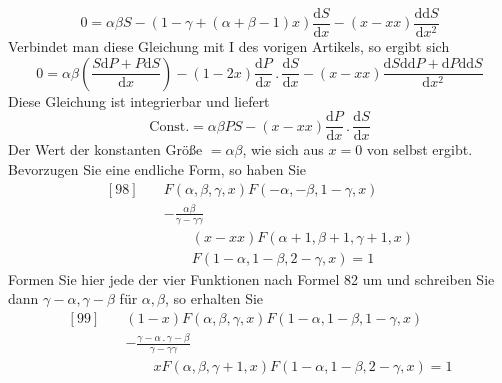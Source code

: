 \[
0=\alpha\beta S-(1-\gamma+(\alpha+\beta-1)x)\frac{\mathrm dS}{\mathrm dx}-(x-xx)\frac{\mathrm{dd}S}{\mathrm dx^2}
\]
Verbindet man diese Gleichung mit I des vorigen Artikels, so ergibt sich
\[
0=\alpha\beta\left(\frac{S\mathrm dP+P\mathrm dS}{\mathrm dx}\right)
-(1-2x)\frac{\mathrm dP}{\mathrm dx}\mathbin{.}\frac{\mathrm dS}{\mathrm dx}
-(x-xx)\frac{\mathrm dS\mathrm{dd}P+\mathrm dP\mathrm{dd}S}{\mathrm dx^2}
\]
Diese Gleichung ist integrierbar und liefert
\[
\mathrm{Const.}=\alpha\beta PS-(x-xx)\frac{\mathrm dP}{\mathrm dx}\mathbin{.}\frac{\mathrm dS}{\mathrm dx}
\]
Der Wert der konstanten Größe $=\alpha\beta$, wie sich aus $x=0$ von selbst ergibt. Bevorzugen Sie eine endliche Form, so haben Sie
\[
\begin{aligned}
{}[98]\quad&F(\alpha,\beta,\gamma,x)F(-\alpha,-\beta,1-\gamma,x)\\
&-\frac{\alpha\beta}{\gamma-\gamma\gamma}\\&\qquad(x-xx)F(\alpha+1,\beta+1,\gamma+1,x)\\&\qquad F(1-\alpha,1-\beta,2-\gamma,x)=1
\end{aligned}
\]
Formen Sie hier jede der vier Funktionen nach Formel 82 um und schreiben Sie dann $\gamma-\alpha,\gamma-\beta$ für $\alpha,\beta$, so erhalten Sie
\[
\begin{aligned}
{}[99]\quad&(1-x)F(\alpha,\beta,\gamma,x)F(1-\alpha,1-\beta,1-\gamma,x)\\
&-\frac{\gamma-\alpha\mathbin{.}\gamma-\beta}{\gamma-\gamma\gamma}\\&\qquad xF(\alpha,\beta,\gamma+1,x)F(1-\alpha,1-\beta,2-\gamma,x)=1
\end{aligned}
\]
